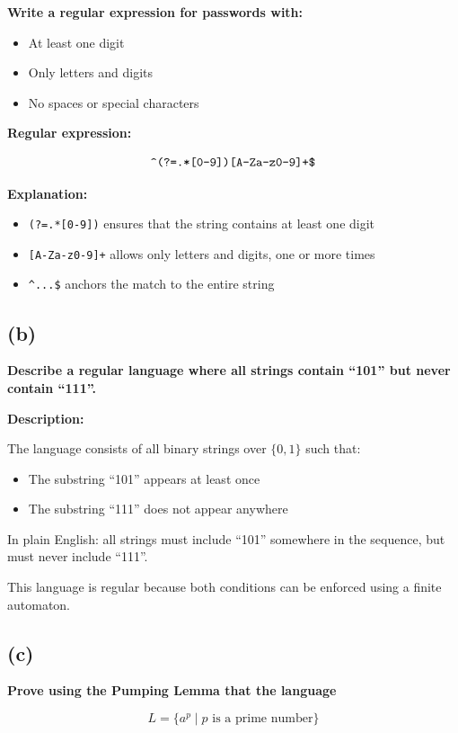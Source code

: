 \documentclass{article}
\begin{document}
\textbf{Write a regular expression for passwords with:}
\begin{itemize}
  \item At least one digit
  \item Only letters and digits
  \item No spaces or special characters
\end{itemize}

\textbf{Regular expression:}

\[
\verb!^(?=.*[0-9])[A-Za-z0-9]+$!
\]

\textbf{Explanation:}
\begin{itemize}
  \item \verb!(?=.*[0-9])! ensures that the string contains at least one digit
  \item \verb![A-Za-z0-9]+! allows only letters and digits, one or more times
  \item \verb!^...$! anchors the match to the entire string
\end{itemize}

\subsection*{(b)}

\textbf{Describe a regular language where all strings contain “101” but never contain “111”.}

\textbf{Description:}

The language consists of all binary strings over \(\{0,1\}\) such that:

\begin{itemize}
  \item The substring “101” appears at least once
  \item The substring “111” does not appear anywhere
\end{itemize}

In plain English: all strings must include “101” somewhere in the sequence, but must never include “111”.

This language is regular because both conditions can be enforced using a finite automaton.

\subsection*{(c)}

\textbf{Prove using the Pumping Lemma that the language}

\[
L = \{ a^p \mid p \text{ is a prime number} \}
\]
\end{document}
